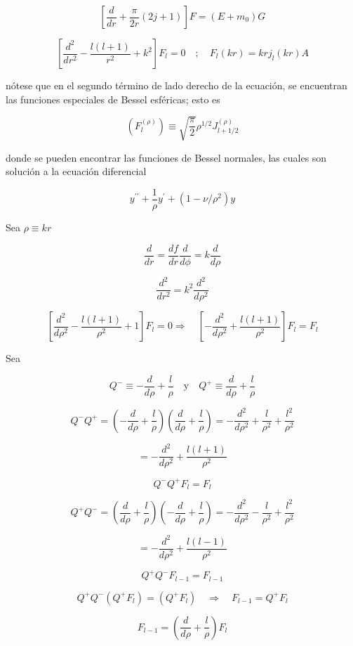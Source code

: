 \documentclass{report}
\begin{document}
\[[\frac{d}{dr} + \frac{\pi}{2r} (2j+1)] F = (E+m_0 ) G\]

\[[\frac{d^2}{dr^2} - \frac{l(l+1)}{r^2} + k^2] F_l = 0 \quad ; \quad F_l (kr) = kr j_l (kr) A\]

nótese que en el segundo término de lado derecho de la ecuación, se encuentran las funciones especiales de Bessel esféricas; esto es

\[(F_{l}^{(\rho)}) \equiv \sqrt{\frac{\pi}{2}} \rho^{1/2} J_{l+1/2}^{(\rho)}\]

donde se pueden encontrar las funciones de Bessel normales, las cuales son solución a la ecuación diferencial

\[y^{\prime \prime}+\frac{1}{\rho} y^{\prime} + (1- \nu/\rho^{2}) y\]

Sea $\rho \equiv kr$

\[\frac{d}{dr} = \frac{d f}{dr} \frac{d}{d \phi} = k \frac{d}{d\rho}\]

\[\frac{d^2}{dr^2} = k^2 \frac{d^2}{d \rho ^2}\]

\[[\frac{d^2}{d\rho ^2} - \frac{l(l+1)}{\rho^2} + 1 ] F_l = 0 \Rightarrow \quad [-\frac{d^2}{d \rho^2} + \frac{l(l+1)}{\rho ^2} ] F_l = F_l\]

Sea 

\[Q^{-} \equiv - \frac{d}{d\rho } + \frac{l}{\rho} \quad \text{y} \quad Q^{+} \equiv \frac{d}{d \rho } + \frac{l}{\rho }\]

\[Q^{-}Q^{+} = (- \frac{d}{d \rho } + \frac{l}{\rho})(\frac{d}{d\rho} + \frac{l}{\rho }) = - \frac{d^2}{d \rho ^2 } + \frac{l}{\rho ^2} + \frac{l^2}{\rho ^2}\]

\[= - \frac{d^2}{d \rho ^2} + \frac{l(l+1)}{\rho ^2}\]

\begin{equation}
Q^{-}Q^{+} F_{l} = F_{l}
\end{equation}

\[Q^{+}Q^{-} = (\frac{d}{d\rho} + \frac{l}{\rho })(- \frac{d}{d\rho } + \frac{l}{\rho })= - \frac{d^2 }{d \rho ^2 } - \frac{l}{\rho^2 } + \frac{l^2 }{\rho ^2 }\]

\[= - \frac{d^2}{d \rho^2 } + \frac{l(l-1)}{\rho ^2}\]

\begin{equation}
Q^+ Q^- F_{l-1} = F_{l-1}
\end{equation}

\[Q^+ Q^- (Q^+ F_l ) = (Q^+ F_l) \quad \Rightarrow \quad F_{l-1} = Q^+ F_l\]

\begin{equation}
F_{l-1} = (\frac{d}{d\rho } + \frac{l}{\rho}) F_l
\end{equation}
\end{document}

